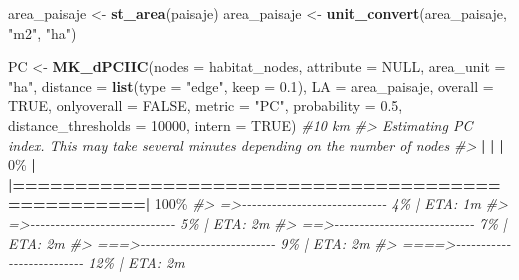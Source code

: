 \documentclass[
]{book}
\newenvironment{Shaded}{\begin{snugshade}}{\end{snugshade}}
\newcommand{\AttributeTok}[1]{\textcolor[rgb]{0.13,0.29,0.53}{#1}}
\newcommand{\CommentTok}[1]{\textcolor[rgb]{0.56,0.35,0.01}{\textit{#1}}}
\newcommand{\ConstantTok}[1]{\textcolor[rgb]{0.56,0.35,0.01}{#1}}
\newcommand{\DecValTok}[1]{\textcolor[rgb]{0.00,0.00,0.81}{#1}}
\newcommand{\ErrorTok}[1]{\textcolor[rgb]{0.64,0.00,0.00}{\textbf{#1}}}
\newcommand{\FloatTok}[1]{\textcolor[rgb]{0.00,0.00,0.81}{#1}}
\newcommand{\FunctionTok}[1]{\textcolor[rgb]{0.13,0.29,0.53}{\textbf{#1}}}
\newcommand{\NormalTok}[1]{#1}
\newcommand{\OtherTok}[1]{\textcolor[rgb]{0.56,0.35,0.01}{#1}}
\newcommand{\SpecialCharTok}[1]{\textcolor[rgb]{0.81,0.36,0.00}{\textbf{#1}}}
\newcommand{\StringTok}[1]{\textcolor[rgb]{0.31,0.60,0.02}{#1}}
\begin{document}
\begin{Shaded}
\begin{Highlighting}[]
\NormalTok{area\_paisaje }\OtherTok{\textless{}{-}} \FunctionTok{st\_area}\NormalTok{(paisaje) }
\NormalTok{area\_paisaje }\OtherTok{\textless{}{-}} \FunctionTok{unit\_convert}\NormalTok{(area\_paisaje, }\StringTok{"m2"}\NormalTok{, }\StringTok{"ha"}\NormalTok{) }

\NormalTok{PC }\OtherTok{\textless{}{-}} \FunctionTok{MK\_dPCIIC}\NormalTok{(}\AttributeTok{nodes =}\NormalTok{ habitat\_nodes,}
                \AttributeTok{attribute =} \ConstantTok{NULL}\NormalTok{,}
                \AttributeTok{area\_unit =} \StringTok{"ha"}\NormalTok{,}
                \AttributeTok{distance =} \FunctionTok{list}\NormalTok{(}\AttributeTok{type =} \StringTok{"edge"}\NormalTok{, }\AttributeTok{keep =} \FloatTok{0.1}\NormalTok{),}
                \AttributeTok{LA =}\NormalTok{ area\_paisaje,}
                \AttributeTok{overall =} \ConstantTok{TRUE}\NormalTok{,}
                \AttributeTok{onlyoverall =} \ConstantTok{FALSE}\NormalTok{,}
                \AttributeTok{metric =} \StringTok{"PC"}\NormalTok{,}
                \AttributeTok{probability =} \FloatTok{0.5}\NormalTok{,}
                \AttributeTok{distance\_thresholds =} \DecValTok{10000}\NormalTok{,}
                \AttributeTok{intern =} \ConstantTok{TRUE}\NormalTok{) }\CommentTok{\#10 km}
\CommentTok{\#\textgreater{} Estimating PC index. This may take several minutes depending on the number of nodes}
\CommentTok{\#\textgreater{} }
  \SpecialCharTok{|}                                                        
  \ErrorTok{|}                                                  \ErrorTok{|}   \DecValTok{0}\NormalTok{\%}
  \SpecialCharTok{|}                                                        
  \ErrorTok{|==================================================|} \DecValTok{100}\NormalTok{\%}
\CommentTok{\#\textgreater{}  =\textgreater{}{-}{-}{-}{-}{-}{-}{-}{-}{-}{-}{-}{-}{-}{-}{-}{-}{-}{-}{-}{-}{-}{-}{-}{-}{-}{-}{-}{-}{-}    4\% |  ETA:  1m}
\CommentTok{\#\textgreater{}  =\textgreater{}{-}{-}{-}{-}{-}{-}{-}{-}{-}{-}{-}{-}{-}{-}{-}{-}{-}{-}{-}{-}{-}{-}{-}{-}{-}{-}{-}{-}{-}    5\% |  ETA:  2m}
\CommentTok{\#\textgreater{}  ==\textgreater{}{-}{-}{-}{-}{-}{-}{-}{-}{-}{-}{-}{-}{-}{-}{-}{-}{-}{-}{-}{-}{-}{-}{-}{-}{-}{-}{-}{-}    7\% |  ETA:  2m}
\CommentTok{\#\textgreater{}  ===\textgreater{}{-}{-}{-}{-}{-}{-}{-}{-}{-}{-}{-}{-}{-}{-}{-}{-}{-}{-}{-}{-}{-}{-}{-}{-}{-}{-}{-}    9\% |  ETA:  2m}
\CommentTok{\#\textgreater{}  ====\textgreater{}{-}{-}{-}{-}{-}{-}{-}{-}{-}{-}{-}{-}{-}{-}{-}{-}{-}{-}{-}{-}{-}{-}{-}{-}{-}{-}   12\% |  ETA:  2m}

\end{Highlighting}
\end{Shaded}
\end{document}
